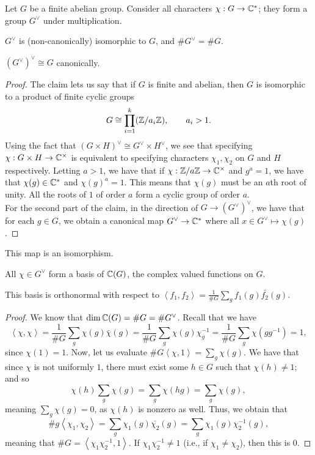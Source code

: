 \noindent Let $G$ be a finite abelian group. Consider all characters $\chi : G \to \mathbb C^\ast$; they form a group $G^\vee$ under multiplication.
\begin{claim}
    \begin{parlist}
        \item $G^\vee$ is (non-canonically) isomorphic to $G$, and $\# G^\vee = \# G$.
        \item $(G^\vee)^\vee \cong G$ canonically.
    \end{parlist}
\end{claim}
\begin{proof}
    The claim lets us say that if $G$ is finite and abelian, then $G$ is isomorphic to a product of finite cyclic groups
    \[ G \cong \prod_{i=1}^k (\mathbb Z / a_i \mathbb Z), \qquad a_i > 1. \]
    Using the fact that $(G \times H)^\vee \cong G^\vee \times H^\vee$, we see that specifying $\chi : G \times H \to \mathbb C^\times$ is equivalent to specifying characters $\chi_1, \chi_2$ on $G$ and $H$ respectively. Letting $a > 1$, we have that if $\chi : \mathbb Z / a \mathbb Z \to \mathbb C^\times$ and $g^a = 1$, we have that $\chi(g) \in \mathbb C^\ast$ and $\chi(g)^a = 1$. This means that $\chi(g)$ must be an $a$th root of unity. All the roots of $1$ of order $a$ form a cyclic group of order $a$.
    \\[8pt]
    For the second part of the claim, in the direction of $G \to (G^\vee)^\vee$, we have that for each $g \in G$, we obtain a canonical map $G^\vee \to \mathbb C^\ast$ where all $x \in G^\vee \mapsto \chi(g)$.
\end{proof}
\begin{lemma}
    This map is an isomorphism.
\end{lemma}
\begin{lemma}
    \begin{parlist}
        \item All $\chi \in G^\vee$ form a basis of $\mathbb C(G)$, the complex valued functions on $G$.
        \item This basis is orthonormal with respect to $\left<f_1, f_2\right> = \frac{1}{\# G} \sum_g f_1(g) \bar{f_2}(g)$.
    \end{parlist}
\end{lemma}
\begin{proof}
    We know that $\dim \mathbb C(G) = \# G = \# G^\vee$. Recall that we have
    \[ \left<\chi, \chi\right> = \frac{1}{\# G} \sum_g \chi(g) \bar{\chi}(g) = \frac{1}{\# G} \sum_g \chi(g) \chi_g^{-1} = \frac{1}{\# G} \sum_g \chi(gg^{-1}) = 1, \]
    since $\chi(1) = 1$. Now, let us evaluate $\# G \left<\chi, 1\right> = \sum_g \chi(g)$. We have that since $\chi$ is not uniformly $1$, there must exist some $h \in G$ such that $\chi(h) \neq 1$; and so
    \[ \chi(h) \sum_g \chi(g) = \sum_g \chi(hg) = \sum_g \chi(g), \]
    meaning $\sum_g \chi(g) = 0$, as $\chi(h)$ is nonzero as well. Thus, we obtain that
    \[ \# g \left<\chi_1, \chi_2\right> = \sum_g \chi_1(g) \bar{\chi_2}(g) = \sum_g \chi_1(g) \chi_2^{-1}(g), \]
    meaning that $\# G = \left<\chi_1 \chi_2^{-1}, 1\right>$. If $\chi_1 \chi_2^{-1} \neq 1$ (i.e., if $\chi_1 \neq \chi_2$), then this is $0$.
\end{proof}
